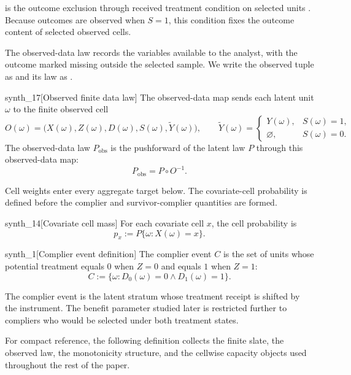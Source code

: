  is the outcome exclusion through received treatment condition on selected units \citep{KennedyHarrisKeele2019}. Because outcomes are observed when \(S=1\), this condition fixes the outcome content of selected observed cells.

The observed-data law records the variables available to the analyst, with the outcome marked missing outside the selected sample. We write the observed tuple as  and its law as .

\begin{definitionv}{synth_17}[Observed finite data law]
The observed-data map sends each latent unit \(\omega\) to the finite observed cell
\[
O(\omega)
=
\bigl(X(\omega),Z(\omega),D(\omega),S(\omega),\widetilde Y(\omega)\bigr),
\qquad
\widetilde Y(\omega)
=
\begin{cases}
Y(\omega), & S(\omega)=1,\\
\varnothing, & S(\omega)=0.
\end{cases}
\]
The observed-data law \(P_{\mathrm{obs}}\) is the pushforward of the latent law \(P\) through this observed-data map:
\[
P_{\mathrm{obs}}=P\circ O^{-1}.
\]
\end{definitionv}

Cell weights enter every aggregate target below. The covariate-cell probability  is defined before the complier and survivor-complier quantities are formed.

\begin{definitionv}{synth_14}[Covariate cell mass]
For each covariate cell \(x\), the cell probability is
\[
p_x := P\{\omega : X(\omega)=x\}.
\]
\end{definitionv}

\begin{definitionv}{synth_1}[Complier event definition]
The complier event \(C\) is the set of units whose potential treatment equals \(0\) when \(Z=0\) and equals \(1\) when \(Z=1\):
\[
C := \{\omega : D_0(\omega)=0 \land D_1(\omega)=1\}.
\]
\end{definitionv}

The complier event  is the latent stratum whose treatment receipt is shifted by the instrument. The benefit parameter studied later is restricted further to compliers who would be selected under both treatment states.

For compact reference, the following definition collects the finite slate, the observed law, the monotonicity structure, and the cellwise capacity objects used throughout the rest of the paper.

